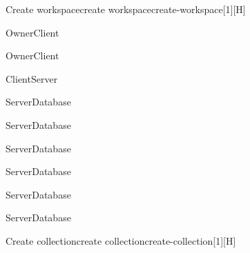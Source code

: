 \begin{toexclude}
\begin{sdfig}{Create workspace}{create workspace}{create-workspace}[1][H]
    \begin{seqdigauth}[Owner]
      \begin{umlcall}[op={Create workspace},return={Redirect to workspace creation}]{Owner}{Client}
      \end{umlcall}
      \begin{umlcall}[op={Submit name}]{Owner}{Client}
        \begin{umlcall}[op={Create workspace},return=Ok]{Client}{Server}
          \begin{umlcall}[op={Create project}]{Server}{Database}
            \begin{umlcall}[op={Create collection}]{Server}{Database}
              \begin{umlcall}[op={Create field}]{Server}{Database}
              \end{umlcall}
              \begin{umlcall}[op={Create view}]{Server}{Database}
              \end{umlcall}
              \begin{umlcall}[op={Create document}]{Server}{Database}
                \begin{umlcall}[op={Create block}]{Server}{Database}
                \end{umlcall}
              \end{umlcall}
            \end{umlcall}
          \end{umlcall}
        \end{umlcall}
      \end{umlcall}
    \end{seqdigauth}
  \end{sdfig}

  \begin{sdfig}{Create collection}{create collection}{create-collection}[1][H]


\end{sdfig}
\end{toexclude}
